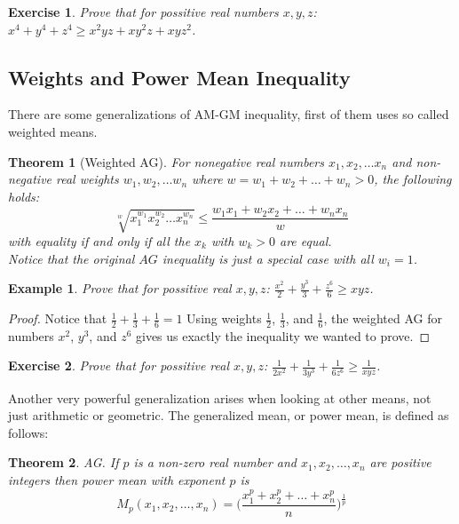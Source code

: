 \documentclass[11pt,a5paper]{article}
\newtheorem{theorem}{Example}
\newtheorem{exercise}{Exercise}
\newtheorem*{Theorem}{Theorem}
\begin{document}
\begin{exercise} Prove that for possitive real numbers $x, y, z$: 
$x^4 + y^4 + z^4 \ge x^2yz + xy^2z + xyz^2$.
\end{exercise}

\subsection*{Weights and Power Mean Inequality}

There are some generalizations of AM-GM inequality, first of them uses 
so called weighted means. 
\begin{Theorem}[Weighted AG]
	For nonegative real numbers $x_1, x_2, \dots x_n$ and non-negative real 
	weights $w_1, w_2, \dots w_n$ where $w = w_1 + w_2 + \dots + w_n > 0$, the following holds:\\
\[\sqrt[w]{x_1^{w_1}x_2^{w_2}\dots x_n^{w_n}} \le  \frac{w_1x_1 + w_2x_2 + \dots + w_nx_n}{w}\] 
	with equality if and only if all the $x_k$ with $w_k > 0$ are equal. \\
	Notice that the original $AG$ inequality is just a special case with all $w_i = 1$.

\end{Theorem}

\begin{theorem}
	Prove that for possitive real $x, y, z$: 
	$\frac{x^2}{2} + \frac{y^3}{3} + \frac{z^6}{6} \ge xyz$.
\end{theorem}

\begin{proof} 
	Notice that $\frac{1}{2} + \frac{1}{3} + \frac{1}{6} = 1$ Using weights $\frac{1}{2}$, $\frac{1}{3}$, and $\frac{1}{6}$, the weighted AG for numbers $x^2$, $y^3$, and $z^6$ gives us exactly the inequality we wanted to prove.
\end{proof}

\begin{exercise} Prove that for possitive real $x, y, z$: 
	$\frac{1}{2x^2} + \frac{1}{3y^3} + \frac{1}{6z^6} \ge \frac{1}{xyz}$.
\end{exercise}

\noindent Another very powerful generalization arises when looking at other means, 
not just arithmetic or geometric. The generalized mean, or power mean, 
is defined as follows:

\begin{Theorem} \emph{AG.}
If $p$ is a non-zero real number and $x_1, x_2, \dots , x_n$ are positive 
integers then power mean with exponent $p$ is
\[M_p(x_1, x_2, \dots, x_n) 
= \bigg(\dfrac{x_1^p + x_2^p + \dots + x_n^p}{n}\bigg)^\frac{1}{p}\]
\end{Theorem}
\end{document}
